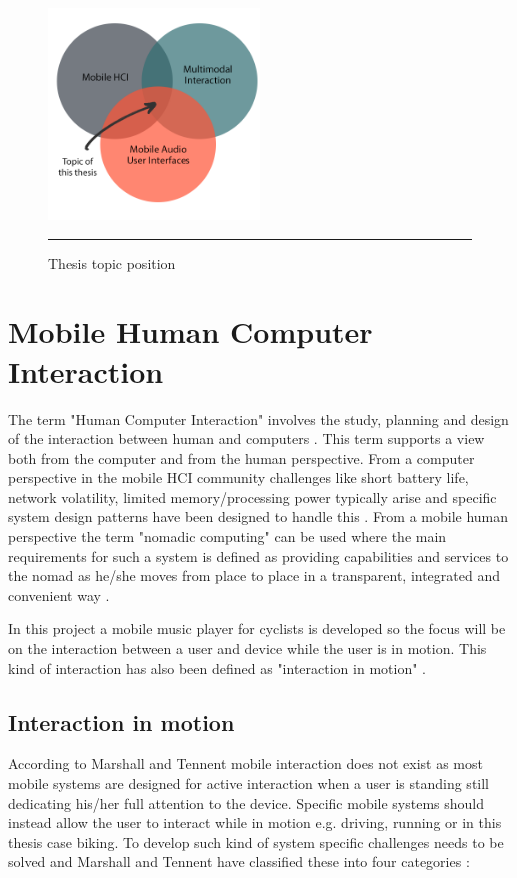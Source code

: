 \begin{figure}[htbp]
	\centering
		\includegraphics[width=0.5\textwidth,height=\textheight,keepaspectratio]{./Figures/venn.png}
		\rule{35em}{0.5pt}
	\caption[Venn diagram]{Thesis topic position}
	\label{fig:venn}
\end{figure}


\section{Mobile Human Computer Interaction}
The term "Human Computer Interaction" involves the study, planning and design of the interaction between human and computers \cite{card_psychology_1983}. This term supports a view both from the computer and from the human perspective. From a computer perspective in the mobile HCI community challenges like short battery life, network volatility, limited memory/processing power typically arise and specific system design patterns have been designed to handle this \cite{roth_patterns_2002}. From a mobile human perspective the term "nomadic computing" can be used where the main requirements for such a system is defined as providing capabilities and services to the nomad as he/she moves from place to place in a transparent, integrated and convenient way \cite{sawhney_nomadic_2000}.

In this project a mobile music player for cyclists is developed so the focus will be on the interaction between a user and device while the user is in motion. This kind of interaction has also been defined as "interaction in motion" \cite{marshall_mobile_2013}.

\subsection{Interaction in motion}
\label{sec:interactioninmotion}
According to Marshall and Tennent \cite{marshall_mobile_2013} mobile interaction does not exist as most mobile systems are designed for active interaction when a user is standing still dedicating his/her full attention to the device. Specific mobile systems should instead allow the user to interact while in motion e.g. driving, running or in this thesis case biking. To develop such kind of system specific challenges needs to be solved and Marshall and Tennent have classified these into four categories \cite{marshall_mobile_2013}:


